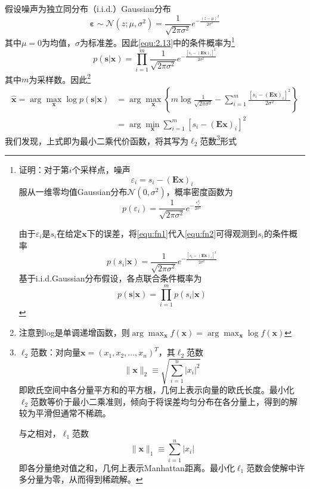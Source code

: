 \documentclass[12pt]{article}
\begin{document}
假设噪声为独立同分布（i.i.d.）Gaussian分布
\begin{equation}
    \bm{\varepsilon}\sim\mathcal{N}\left(z;\mu,\sigma^2\right)=\frac{1}{\sqrt{2\pi\sigma^2}} e^{-\frac{(z-\mu)^2}{2\sigma^2}}
    \label{equ:2.14}
\end{equation}
其中$\mu=0$为均值，$\sigma$为标准差。因此\autoref{equ:2.13}中的条件概率为\footnote{证明：对于第$i$个采样点，噪声
\begin{equation}
    \varepsilon_i=s_i-(\mathbf{E}\bm{x})_i
    \label{equ:fn1}
\end{equation}
服从一维零均值Gaussian分布$\mathcal{N}(0,\sigma^2)$，概率密度函数为
\begin{equation}
    p(\varepsilon_i)=\frac{1}{\sqrt{2\pi\sigma^2}}e^{-\frac{\varepsilon_i^2}{2\sigma^2}}
    \label{equ:fn2}
\end{equation}

由于$\varepsilon_i$是$s_i$在给定$\bm{x}$下的误差，将\autoref{equ:fn1}代入\autoref{equ:fn2}可得观测到$s_i$的条件概率
\begin{equation}
    p(s_i|\bm{x})=\frac{1}{\sqrt{2\pi\sigma^2}}e^{-\frac{\left[s_i-(\mathbf{E}\bm{x})_i\right]^2}{2\sigma^2}}
\end{equation}
基于i.i.d.Gaussian分布假设，各点联合条件概率为
\begin{equation}
    p(\bm{s}|\bm{x})=\prod_{i=1}^{m} p(s_i|\bm{x})
\end{equation}
}
\begin{equation}
    p(\bm{s}|\bm{x})=\prod_{i=1}^{m}\frac{1}{\sqrt{2\pi\sigma^2}} e^{-\frac{\left[s_i-(\mathbf{E}\bm{x})_i\right]^2}{2\sigma^2}}
    \label{equ:2.15}
\end{equation}
其中$m$为采样数。因此\footnote{注意到log是单调递增函数，则$\arg\max_{\bm{x}}f(\bm{x})=\arg\max_{\bm{x}}\log f(\bm{x})$}
\begin{equation}
    \begin{aligned}
        \hat{\bm{x}}=\arg\max_{\bm{x}}\log p(\bm{s}|\bm{x})
        &=\arg\max_{\bm{x}}\left\{m\log\frac{1}{\sqrt{2\pi\sigma^2}}-\sum_{i=1}^{m}\frac{\left[s_i-(\mathbf{E}\bm{x})_i\right]^2}{2\sigma^2}\right\} \\
        &=\arg\min_{\bm{x}}\sum_{i=1}^{m} \left[s_i-(\mathbf{E}\bm{x})_i\right]^2
        \label{equ:2.16}
    \end{aligned}
\end{equation}
我们发现，上式即为最小二乘代价函数，将其写为$\ell_2$范数\footnote{$\ell_2$范数：对向量$\bm{x}=(x_1,x_2,\ldots,x_n)^T$，其$\ell_2$范数
\begin{equation}
    \|\bm{x}\|_2\equiv\sqrt{\sum_{i=1}^{n}|x_i|^2}
\end{equation}
即欧氏空间中各分量平方和的平方根，几何上表示向量的欧氏长度。最小化$\ell_2$范数等价于最小二乘准则，倾向于将误差均匀分布在各分量上，得到的解较为平滑但通常不稀疏。

与之相对，$\ell_1$范数
\begin{equation}
    \|\bm{x}\|_1\equiv\sum_{i=1}^{n}|x_i|
\end{equation}
即各分量绝对值之和，几何上表示Manhattan距离。最小化$\ell_1$范数会使解中许多分量为零，从而得到稀疏解。}形式
\end{document}

